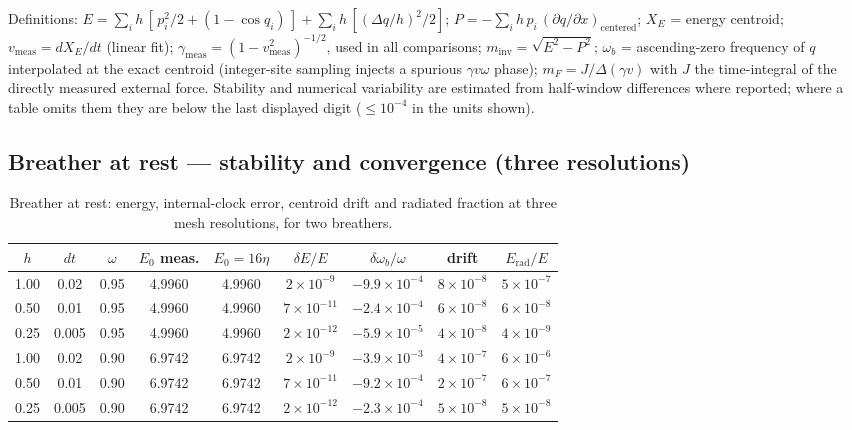 \documentclass[11pt,a4paper]{article}
\theoremstyle{plain}
\theoremstyle{remark}
\begin{document}
Definitions: $E = \sum_i h\,[\,p_i^2/2 + (1-\cos q_i)\,] + \sum_i h\,[(\Delta q/h)^2/2]$; $P = -\sum_i h\, p_i\,(\partial q/\partial x)_{\text{centered}}$; $X_E$ = energy centroid; $v_{\text{meas}} = dX_E/dt$ (linear fit); $\gamma_{\text{meas}} = (1 - v_{\text{meas}}^2)^{-1/2}$, used in all comparisons; $m_{\text{inv}} = \sqrt{E^2 - P^2}$; $\omega_b$ = ascending-zero frequency of $q$ interpolated at the exact centroid (integer-site sampling injects a spurious $\gamma v \omega$ phase); $m_F = J/\Delta(\gamma v)$ with $J$ the time-integral of the directly measured external force. Stability and numerical variability are estimated from half-window differences where reported; where a table omits them they are below the last displayed digit ($\le 10^{-4}$ in the units shown).

\subsection{Breather at rest --- stability and convergence (three resolutions)}

\begin{table}[htbp]
\centering\small
\begin{tabular}{ccccccccc}
\toprule
$h$ & $dt$ & $\omega$ & $E_0$ meas. & $E_0 = 16\eta$ & $\delta E/E$ & $\delta\omega_b/\omega$ & drift & $E_{\text{rad}}/E$ \\
\midrule
1.00 & 0.02  & 0.95 & 4.9960 & 4.9960 & $2\times10^{-9}$  & $-9.9\times10^{-4}$ & $8\times10^{-8}$ & $5\times10^{-7}$ \\
0.50 & 0.01  & 0.95 & 4.9960 & 4.9960 & $7\times10^{-11}$ & $-2.4\times10^{-4}$ & $6\times10^{-8}$ & $6\times10^{-8}$ \\
0.25 & 0.005 & 0.95 & 4.9960 & 4.9960 & $2\times10^{-12}$ & $-5.9\times10^{-5}$ & $4\times10^{-8}$ & $4\times10^{-9}$ \\
1.00 & 0.02  & 0.90 & 6.9742 & 6.9742 & $2\times10^{-9}$  & $-3.9\times10^{-3}$ & $4\times10^{-7}$ & $6\times10^{-6}$ \\
0.50 & 0.01  & 0.90 & 6.9742 & 6.9742 & $7\times10^{-11}$ & $-9.2\times10^{-4}$ & $2\times10^{-7}$ & $6\times10^{-7}$ \\
0.25 & 0.005 & 0.90 & 6.9742 & 6.9742 & $2\times10^{-12}$ & $-2.3\times10^{-4}$ & $5\times10^{-8}$ & $5\times10^{-8}$ \\
\bottomrule
\end{tabular}
\caption{Breather at rest: energy, internal-clock error, centroid drift and radiated fraction at three mesh resolutions, for two breathers.}
\label{tab:breather_rest}
\end{table}
\end{document}
